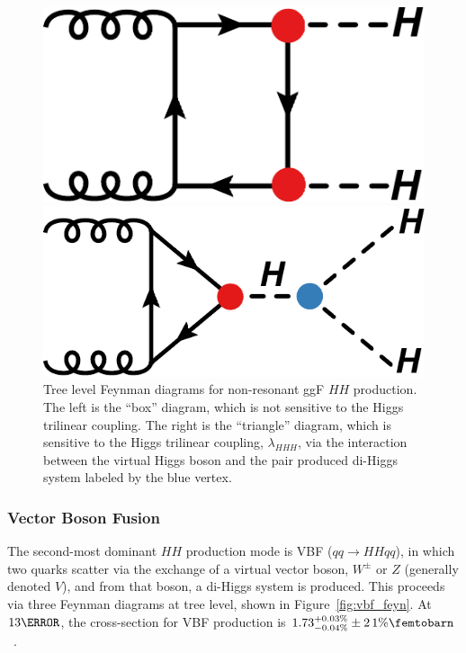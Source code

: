 \begin{figure}[!thp]
    \centering
    \begin{minipage}[c]{.40\textwidth}
        \includegraphics[width=\textwidth]{chapters/chapter1_theory/images/hh_box.pdf}
    \end{minipage}
    \hspace{0.09\textwidth}
    \begin{minipage}[c]{.40\textwidth}
        \includegraphics[width=\textwidth]{chapters/chapter1_theory/images/hh_triangle.pdf}
    \end{minipage}

    \caption[Tree level Feynman diagrams for non-resonant \gls{ggF} $HH$ production]{Tree level Feynman diagrams for non-resonant \gls{ggF} $HH$ production. The left is the ``box'' diagram, which is not sensitive to the Higgs trilinear coupling. The right is the ``triangle'' diagram, which is sensitive to the Higgs trilinear coupling, $\lambda_{HHH}$, via the interaction between the virtual Higgs boson and the pair produced di-Higgs system labeled by the blue vertex.}
    \label{fig:ggf_feyn}
\end{figure}

\subsubsection{Vector Boson Fusion}\label{sssec:vbfHH}
The second-most dominant $HH$ production mode is \gls{VBF} ($qq \rightarrow HHqq$), in which two quarks scatter via the exchange of a virtual vector boson, $W^\pm$ or $Z$ (generally denoted $V$), and from that boson, a di-Higgs system is produced. This proceeds via three Feynman diagrams at tree level, shown in Figure~\ref{fig:vbf_feyn}. At $\unit{13}{\TeV}$, the cross-section for \gls{VBF} production is $1.73^{+0.03\%}_{-0.04\%} \pm \unit{2.1\%}{\femtobarn}$~\cite{hh-crosssections}.

